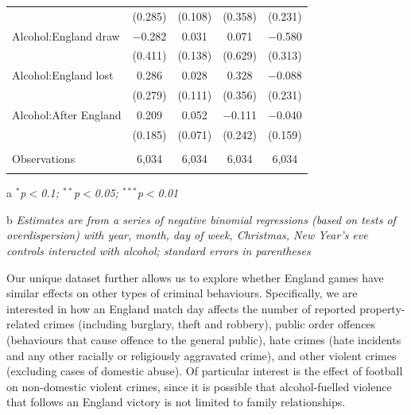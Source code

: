 \documentclass[12pt, letterpaper]{article}
\begin{document}
\begin{table}
{\begin{threeparttable}
\begin{tabular}{@{\extracolsep{5pt}}lcccc}
  & (0.285) & (0.108) & (0.358) & (0.231) \\ 
  Alcohol:England draw & $-$0.282 & 0.031 & 0.071 & $-$0.580 \\ 
  & (0.411) & (0.138) & (0.629) & (0.313) \\ 
  Alcohol:England lost & 0.286 & 0.028 & 0.328 & $-$0.088 \\ 
  & (0.279) & (0.111) & (0.356) & (0.231) \\ 
  Alcohol:After England & 0.209 & 0.052 & $-$0.111 & $-$0.040 \\ 
  & (0.185) & (0.071) & (0.242) & (0.159) \\ 
 \hline \\[-1.8ex] 
Observations & 6,034 & 6,034 & 6,034 & 6,034 \\ 
\hline \\[-1.8ex] 
\end{tabular} 
\begin{tablenotes}
      \item[a] \textit{$^{*}$p$<$0.1; $^{**}$p$<$0.05; $^{***}$p$<$0.01}
      \item[b] \textit{Estimates are from a series of negative binomial regressions (based on tests of overdispersion)  with year, month, day of week, Christmas, New Year's eve controls interacted with alcohol; standard errors in parentheses}
    \end{tablenotes}
\end{threeparttable} }
\end{table}


Our unique dataset further allows us to explore whether England games have similar effects on other types of criminal behaviours. Specifically, we are interested in how an England match day affects the number of reported property-related crimes (including burglary, theft and robbery), public order offences (behaviours that cause offence to the general public), hate crimes (hate incidents and any other racially or religiously aggravated crime), and other violent crimes (excluding cases of domestic abuse). Of particular interest is the effect of football on non-domestic violent crimes, since it is possible that alcohol-fuelled violence that follows an England victory is not limited to family relationships.
\end{document}
